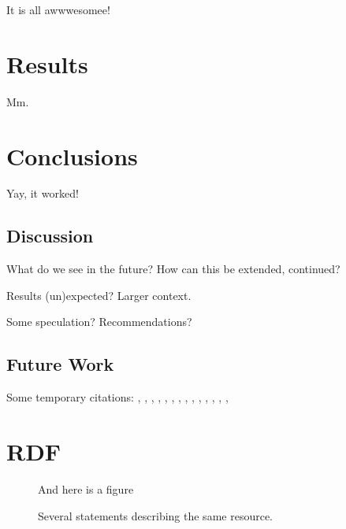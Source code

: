 \documentclass[a4paper,11pt]{kth-mag}
\begin{document}
It is all awwwesomee!





\pagestyle{newchap}
\chapter{Results} \label{chapter-results}

Mm.





\pagestyle{newchap}
\chapter{Conclusions}
Yay, it worked!


\section{Discussion}

What do we see in the future? How can this be extended, continued?

Results (un)expected? Larger context.

Some speculation? Recommendations?

\section{Future Work}


Some temporary citations:
\cite{hoare69}, \cite{floyd67}, \cite{pnueli77}, \cite{leucker09abriefaccount},
\cite{bauer06monitoring}, \cite{bauer08goodbadugly}, \cite{delgado04taxonomy},
\cite{meyer92applyingdbc}, \cite{rosenblum95practicalassertions},
\cite{bartetzko01jass}, \cite{bodden04lightweightltl},
\cite{bodden05efficientrv}, \cite{becksmalltalktesting}, \cite{fowlerxunit},
\cite{matusiak09aoppy}












\appendix
\addappheadtotoc
\chapter{RDF}\label{appA}

\begin{figure}[ht]
\begin{center}
And here is a figure
\caption{\small{Several statements describing the same resource.}}\label{RDF_4}
\end{center}
\end{figure}
\end{document}

